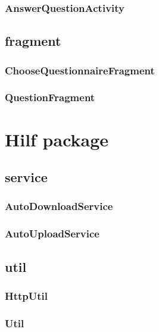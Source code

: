 \documentclass[a4paper]{scrreprt}
\begin{document}
                \subsubsection{AnswerQuestionActivity}

            \subsection{fragment}

                \subsubsection{ChooseQuestionnaireFragment}
                \subsubsection{QuestionFragment}

        \section{Hilf package}

            \subsection{service}

                \subsubsection{AutoDownloadService}

                \subsubsection{AutoUploadService}

            \subsection{util}

                \subsubsection{HttpUtil}

                \subsubsection{Util}

    \glsaddall
    \printglossary

    \listoffigures
\end{document}
